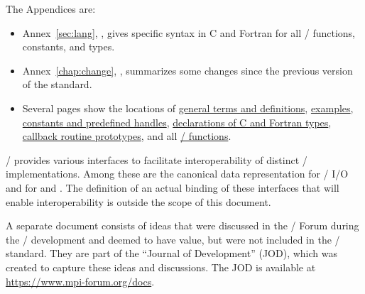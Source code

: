 The Appendices are:

\begin{itemize}
\item
Annex~\ref{sec:lang},
,
gives specific syntax in
C and Fortran
for all \MPI/ functions,
constants, and types.

\item
Annex~\ref{chap:change},
, summarizes some changes since the previous
version of the standard.
\item
Several  pages show the locations of
\hyperref[index:general]{general terms and definitions},    %
\hyperref[index:example]{examples},    %
\hyperref[index:constant]{constants and predefined handles}, %
\hyperref[index:declaration]{declarations of C and Fortran types}, %
\hyperref[index:callback]{callback routine prototypes}, and all %
\hyperref[index:function]{\MPI/ functions}. %

\end{itemize}

\mpi/
provides various interfaces to facilitate interoperability
  of distinct  \mpi/ implementations.  Among these are the canonical
  data representation for \mpi/ I/O and for  and
  .
The definition of an actual binding of these interfaces that will
enable interoperability is outside the scope of this document.

A separate document consists of ideas that were discussed in the
\MPI/ Forum during the \MPIII/ development and
deemed to have value, but were not included in the \mpi/
standard.  They are part of the ``Journal of Development'' (JOD),
which was created to capture these ideas and discussions.
The JOD is available at \url{https://www.mpi-forum.org/docs}.

